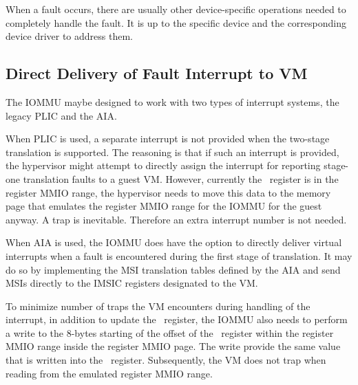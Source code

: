 \note When a fault occurs, there are usually other device-specific operations needed to
completely handle the fault. It is up to the specific device and the corresponding device
driver to address them. \noteend

\subsection{Direct Delivery of Fault Interrupt to VM}

The IOMMU maybe designed to work with two types of interrupt systems, the legacy PLIC and
the AIA.

When PLIC is used, a separate interrupt is not provided when the two-stage translation is supported.
The reasoning is that if such an interrupt is provided, the hypervisor might attempt to
directly assign the interrupt for reporting stage-one translation faults to a guest VM.
However, currently the \ftval\ register is in the register MMIO range, the hypervisor
needs to move this data to the memory page that emulates the register MMIO range for the
IOMMU for the guest anyway. A trap is inevitable. Therefore an extra interrupt number is
not needed.

When AIA is used, the IOMMU does have the option to directly deliver
virtual interrupts when a fault is encountered during the first stage of translation. It
may do so by implementing the MSI translation tables defined by the AIA and send MSIs
directly to the IMSIC registers designated to the VM.

To minimize number of traps the VM encounters during handling of the interrupt, in
addition to update the \ftval\ register, the IOMMU
also needs to perform a write to the 8-bytes starting of the offset of the \ftval\
register within the register MMIO range inside the register MMIO page. The write provide
the same value that is written into the \ftval\ register. Subsequently, the VM does not
trap when reading from the emulated register MMIO range.



